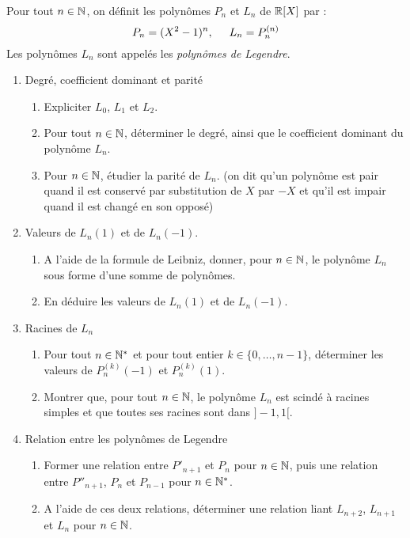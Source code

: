 Pour tout $n\in\mathbb{N}$, on définit les polynômes $P_n$ et $L_n$ de $\mathbb{R}[X]$ par :
\begin{displaymath}
 P_n=(X^2-1)^n, \hspace{0,5cm} L_n=P^{(n)}_n
\end{displaymath}
Les polynômes $L_n$ sont appelés les \emph{polynômes de Legendre}.
\begin{enumerate}
\item Degré, coefficient dominant et parité
\begin{enumerate}
\item Expliciter $L_0$, $L_1$ et $L_2$.
\item Pour tout $n\in\mathbb{N}$, déterminer le degré, ainsi que le coefficient dominant du polynôme $L_n$.
\item Pour $n\in\mathbb{N}$, étudier la parité de $L_n$. (on dit qu'un polynôme est pair quand il est conservé par substitution de $X$ par $-X$ et qu'il est impair quand il est changé en son opposé)
\end{enumerate}
\item  Valeurs de $L_n(1)$ et de $L_n(-1)$.
\begin{enumerate}
\item A l'aide de la formule de Leibniz, donner, pour $n\in\mathbb{N}$, le polynôme $L_n$ sous forme d'une somme de polynômes.
\item  En déduire les valeurs de $L_n(1)$ et de $L_n(-1)$.
\end{enumerate}
\item Racines de $L_n$\begin{enumerate}
\item Pour tout $n\in\mathbb{N}^*$ et pour tout entier $k\in\{0,\dots,n-1\}$, déterminer les valeurs de $P^{(k)}_n(-1)$ et   $P^{(k)}_n(1)$.
\item Montrer que, pour tout $n\in\mathbb{N}$, le polynôme $L_n$ est scindé à racines simples et que toutes ses racines sont dans $]-1,1[$.
\end{enumerate}
\item Relation entre les polynômes de Legendre
\begin{enumerate}
\item Former une relation entre $P'_{n+1}$ et $P_n$ pour $n\in\mathbb{N}$, puis une relation entre $P''_{n+1}$, $P_n$ et $P_{n-1}$ pour $n\in\mathbb{N}^*$.
\item A l'aide de ces deux relations, déterminer une relation liant $L_{n+2}$, $L_{n+1}$ et $L_n$ pour $n\in\mathbb{N}$.
\end{enumerate}
\end{enumerate}
